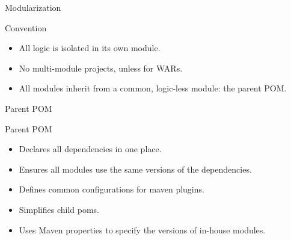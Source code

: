 \documentclass[presentation]{beamer}
\begin{document}
{
\begin{frame}[label=sec-2-2]{Modularization}

\begin{block}{Convention}
\begin{itemize}
\item All logic is isolated in its own module.
\item No multi-module projects, unless for WARs.
\item All modules inherit from a common, logic-less module: the parent POM.
\end{itemize}
\end{block}
\end{frame}} %

{
\begin{frame}[label=sec-2-3]{Parent POM}

\begin{block}{Parent POM}

\begin{itemize}
\item Declares all dependencies in one place.
\item Ensures all modules use the same versions of the dependencies.
\item Defines common configurations for maven plugins.
\item Simplifies child poms.
\item Uses Maven properties to specify the versions of in-house modules.
\end{itemize}
\end{block}
\end{frame}} %
\end{document}
